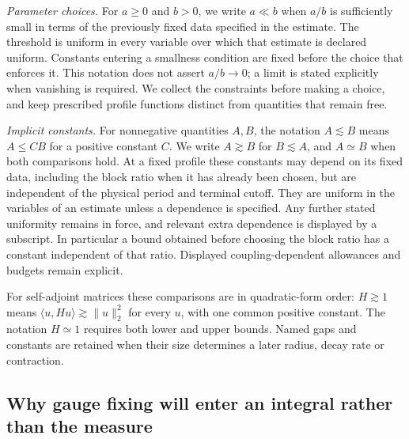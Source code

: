 \documentclass[11pt,reqno]{amsart}
\numberwithin{equation}{section}
\theoremstyle{definition}
\theoremstyle{remark}
\begin{document}
\smallskip\noindent
\emph{Parameter choices.}
For \(a\ge0\) and \(b>0\), we write \(a\ll b\) when \(a/b\) is sufficiently small in
terms of the previously fixed data specified in the estimate.
The threshold is uniform in every variable over which that
estimate is declared uniform. Constants entering a smallness
condition are fixed before the choice that enforces it.
This notation does not assert \(a/b\to0\); a limit is stated
explicitly when vanishing is required. We collect the
constraints before making a choice, and keep prescribed
profile functions distinct from quantities that remain free.

\smallskip\noindent
\emph{Implicit constants.}
For nonnegative quantities \(A,B\), the notation \(A\lesssim B\)
means \(A\le CB\) for a positive constant \(C\).
We write \(A\gtrsim B\) for \(B\lesssim A\), and
\(A\simeq B\) when both comparisons hold.
At a fixed profile these constants may depend on its fixed
data, including the block ratio when it has already been
chosen, but are independent of the physical period and
terminal cutoff. They are uniform in the variables of an
estimate unless a dependence is specified. Any further stated
uniformity remains in force, and relevant extra dependence
is displayed by a subscript. In particular a bound obtained before choosing
the block ratio has a constant independent of that ratio.
Displayed coupling-dependent allowances and budgets remain
explicit.

For self-adjoint matrices these comparisons are in
quadratic-form order: \(H\gtrsim1\) means
\(\langle u,Hu\rangle\gtrsim\|u\|_2^2\) for every \(u\),
with one common positive constant. The notation \(H\simeq1\)
requires both lower and upper bounds. Named gaps and
constants are retained when their size determines a later
radius, decay rate or contraction.

\subsection{Why gauge fixing will enter an integral rather than the measure}
\end{document}
